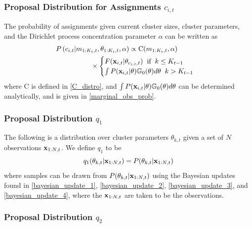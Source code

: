 \documentclass[twocolumn, final]{svjour3}
\begin{document}
\subsubsection{Proposal Distribution for Assignments $c_{i,t}$}
\label{sec:smc_proposal_1}

The probability of assignments given current cluster sizes, cluster parameters, and the Dirichlet process concentration parameter $\alpha$ can be written as
\begin{align}
\begin{split}
\label{smc_assig_eqn}
P &\left( c_{i,t} | m_{1:K_{t}, t}, \theta_{1:K_{t}, t}, \alpha \right) \propto
\text{C}(m_{1:K_{t}, t}, \alpha) \\ 
& \hspace{15mm}\times
\begin{cases}
F(\bold{x}_{i,t} | \theta_{c_{i,t},t}) \hspace{2mm} \text{if} \hspace{2mm} k \leq K_{t-1} \\
\int P(\bold{x}_{i,t} | \theta) \mathbb{G}_{0}(\theta)d\theta \hspace{2mm} k > K_{t-1}
\end{cases}
\end{split}
\end{align}
where C is defined in \eqref{C_distro}, and
$\int P(\bold{x}_{i,t} | \theta) \mathbb{G}_{0}(\theta)d\theta$ can be determined analytically, and is given in \eqref{marginal_obs_prob}.


\subsubsection{Proposal Distribution $q_{1}$}
\label{sec:smc_proposal_2}

The following is a distribution over cluster parameters $\theta_{k,t}$ given a set of $N$ observations $\bold{x}_{1:N, t}$. We define $q_{1}$ to be
\begin{equation}
\label{smc_q1_eqn}
q_{1}(\theta_{k,t} | \bold{x}_{1:N,t}) = P(\theta_{k,t} | \bold{x}_{1:N,t})
\end{equation}
where samples can be drawn from $P(\theta_{k,t} | \bold{x}_{1:N,t})$ using the Bayesian updates found in \eqref{bayesian_update_1}, \eqref{bayesian_update_2}, \eqref{bayesian_update_3}, and \eqref{bayesian_update_4}, where the $\bold{x}_{1:N,t}$ are taken to be the observations.


\subsubsection{Proposal Distribution $q_{2}$}
\label{sec:smc_proposal_3}
\end{document}
